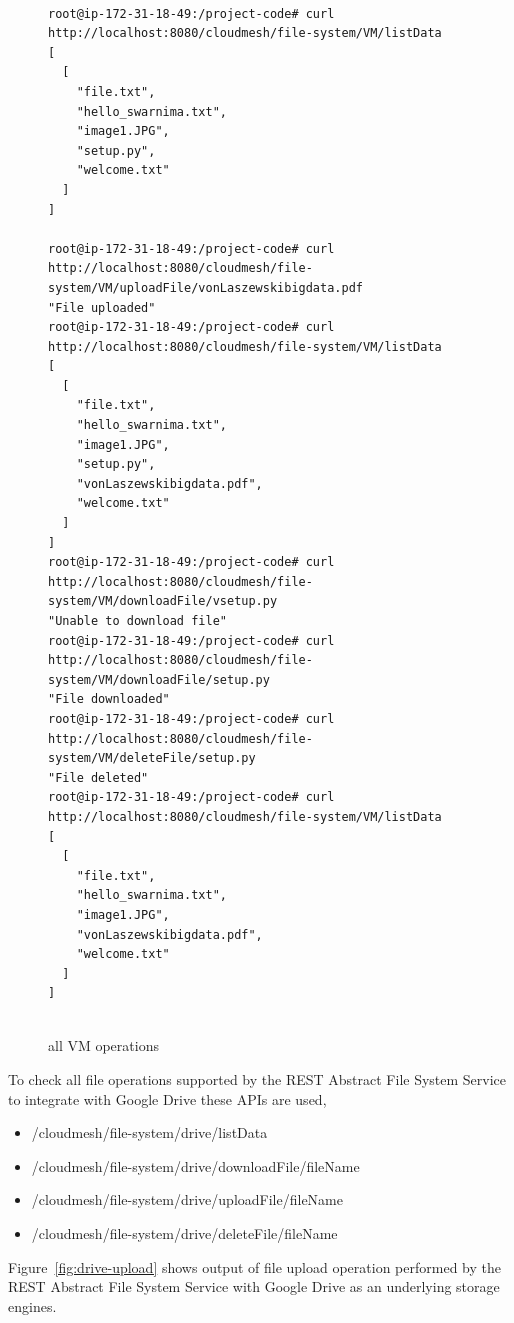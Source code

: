 \begin{figure}[!ht]
\begin{footnotesize}
\begin{verbatim}

root@ip-172-31-18-49:/project-code# curl http://localhost:8080/cloudmesh/file-system/VM/listData
[
  [
    "file.txt",
    "hello_swarnima.txt",
    "image1.JPG",
    "setup.py",
    "welcome.txt"
  ]
]

root@ip-172-31-18-49:/project-code# curl http://localhost:8080/cloudmesh/file-system/VM/uploadFile/vonLaszewskibigdata.pdf
"File uploaded"
root@ip-172-31-18-49:/project-code# curl http://localhost:8080/cloudmesh/file-system/VM/listData                    [
  [
    "file.txt",
    "hello_swarnima.txt",
    "image1.JPG",
    "setup.py",
    "vonLaszewskibigdata.pdf",
    "welcome.txt"
  ]
]
root@ip-172-31-18-49:/project-code# curl http://localhost:8080/cloudmesh/file-system/VM/downloadFile/vsetup.py
"Unable to download file"
root@ip-172-31-18-49:/project-code# curl http://localhost:8080/cloudmesh/file-system/VM/downloadFile/setup.py
"File downloaded"
root@ip-172-31-18-49:/project-code# curl http://localhost:8080/cloudmesh/file-system/VM/deleteFile/setup.py
"File deleted"
root@ip-172-31-18-49:/project-code# curl http://localhost:8080/cloudmesh/file-system/VM/listData
[
  [
    "file.txt",
    "hello_swarnima.txt",
    "image1.JPG",
    "vonLaszewskibigdata.pdf",
    "welcome.txt"
  ]
]


\end{verbatim}
\end{footnotesize}
\caption{all VM operations}\label{fig:VM}
\end{figure}


To check all file operations supported by the REST Abstract File
System Service to integrate with Google Drive these APIs are used,

\begin{itemize}

    \item /cloudmesh/file-system/drive/listData
    \item /cloudmesh/file-system/drive/downloadFile/{fileName}
    \item /cloudmesh/file-system/drive/uploadFile/{fileName}
    \item /cloudmesh/file-system/drive/deleteFile/{fileName}

\end{itemize}

Figure~\ref{fig:drive-upload} shows output of file upload operation
performed by the REST Abstract File System Service with Google Drive
as an underlying storage engines.

